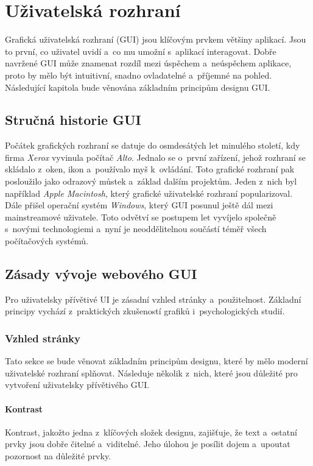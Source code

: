 \chapter{Uživatelská rozhraní}
Grafická uživatelská rozhraní (GUI) jsou klíčovým prvkem většiny aplikací. Jsou to první, co uživatel uvidí a~co mu umožní s~aplikací interagovat. Dobře navržené GUI může znamenat rozdíl mezi úspěchem a~neúspěchem aplikace, proto by mělo být intuitivní, snadno ovladatelné a~příjemné na pohled. Následující kapitola bude věnována základním principům designu GUI.

\section{Stručná historie GUI}
Počátek grafických rozhraní se datuje do osmdesátých let minulého století, kdy firma \textit{Xerox} vyvinula počítač \textit{Alto}. Jednalo se o~první zařízení, jehož rozhraní se skládalo z~oken, ikon a~používalo myš k~ovládání. Toto grafické rozhraní pak posloužilo jako odrazový můstek a~základ dalším projektům. Jeden z~nich byl například \textit{Apple Macintosh}, který grafické uživatelské rozhraní popularizoval. Dále přišel operační systém \textit{Windows}, který GUI posunul ještě dál mezi mainstreamové uživatele. Toto odvětví se postupem let vyvíjelo společně s~novými technologiemi a~nyní je neoddělitelnou součástí téměř všech počítačových systémů.

\section{Zásady vývoje webového GUI}
Pro uživatelsky přívětivé UI je zásadní vzhled stránky a~použitelnost. Základní principy vychází z~praktických zkušeností grafiků i~psychologických studií.

\subsection{Vzhled stránky}
Tato sekce se bude věnovat základním principům designu, které by mělo moderní uživatelské rozhraní splňovat. Následuje několik z~nich, které jsou důležité pro vytvoření uživatelsky přívětivého GUI. \cite{principles_of_design}

\subsubsection*{Kontrast}
Kontrast, jakožto jedna z~klíčových složek designu, zajišťuje, že text a~ostatní prvky jsou dobře čitelné a~viditelné. Jeho úlohou je posílit dojem a~upoutat pozornost na důležité prvky.

